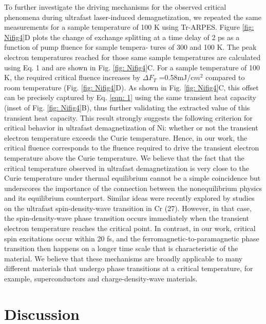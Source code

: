 To further investigate the driving mechanisms for the observed critical phenomena during ultrafast laser-induced demagnetization, we repeated the same measurements for a sample temperature of 100 K using Tr-ARPES. Figure \ref{fig: Nifig4}D plots the change of exchange splitting at a time delay of 2 ps as a function of pump fluence for sample tempera- tures of 300 and 100 K. The peak electron temperatures reached for those same sample temperatures are calculated using Eq. 1 and are shown in Fig. \ref{fig: Nifig4}C. For a sample temperature of 100 K, the required critical fluence increases by $\Delta F_{T}$ =0.58mJ/c$m^2$ compared to room temperature (Fig. \ref{fig: Nifig4}D). As shown in Fig. \ref{fig: Nifig4}C, this offset can be precisely captured by Eq. \ref{eqn: 1} using the same transient heat capacity (inset of Fig. \ref{fig: Nifig4}B), thus further validating the extracted value of this transient heat capacity. This result strongly suggests the following criterion for critical behavior in ultrafast demagnetization of Ni: whether or not the transient electron temperature exceeds the Curie temperature. Hence, in our work, the critical fluence corresponds to the fluence required to drive the transient electron temperature above the Curie temperature. We believe that the fact that the critical temperature observed in ultrafast demagnetization is very close to the Curie temperature under thermal equilibrium cannot be a simple coincidence but underscores the importance of the connection between the nonequilibrium physics and its equilibrium counterpart. Similar ideas were recently explored by studies on the ultrafast spin-density-wave transition in Cr (27). However, in that case, the spin-density-wave phase transition occurs immediately when the transient electron temperature reaches the critical point. In contrast, in our work, critical spin excitations occur within 20 fs, and the ferromagnetic-to-paramagnetic phase transition then happens on a longer time scale that is characteristic of the material. We believe that these mechanisms are broadly applicable to many different materials that undergo phase transitions at a critical temperature, for example, superconductors and charge-density-wave materials.

\section{Discussion}

